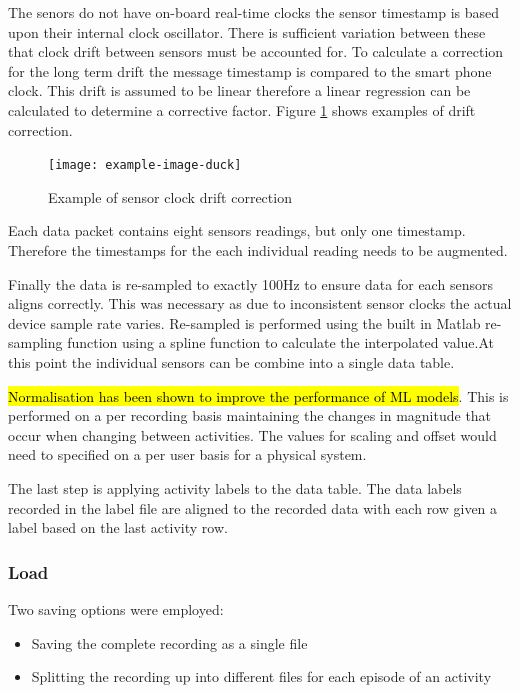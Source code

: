 The senors do not have on-board real-time clocks the sensor timestamp is based upon their internal clock oscillator. There is sufficient variation between these that clock drift between sensors must be accounted for. To calculate a correction for the long term drift the message timestamp is compared to the smart phone clock. This drift is assumed to be linear therefore a linear regression can be calculated to determine a corrective factor. Figure \ref{fig:methods-clock-drift-correction} shows examples of drift correction. %

\begin{figure}[!hbt]
    \centering
    \texttt{[image: example-image-duck]}
    \caption{Example of sensor clock drift correction}
    \label{fig:methods-clock-drift-correction}
\end{figure}

Each data packet contains eight sensors readings, but only one timestamp. Therefore the timestamps for the each individual reading needs to be augmented.

Finally the data is re-sampled to exactly 100Hz to ensure data for each sensors aligns correctly. This was necessary as due to inconsistent sensor clocks the actual device sample rate varies. Re-sampled is performed using the built in Matlab re-sampling function using a spline function to calculate the interpolated value.At this point the individual sensors can be combine into a single data table.

\hl{Normalisation has been shown to improve the performance of ML models}. \cite{} %
This is performed on a per recording basis maintaining the changes in magnitude that occur when changing between activities. The values for scaling and offset would need to specified on a per user basis for a physical system.

The last step is applying activity labels to the data table. The data labels recorded in the label file are aligned to the recorded data with each row given a label based on the last activity row.

\subsubsection{Load}
Two saving options were employed:
\begin{itemize}
    \item Saving the complete recording as a single file
    \item Splitting the recording up into different files for each episode of an activity
\end{itemize}

